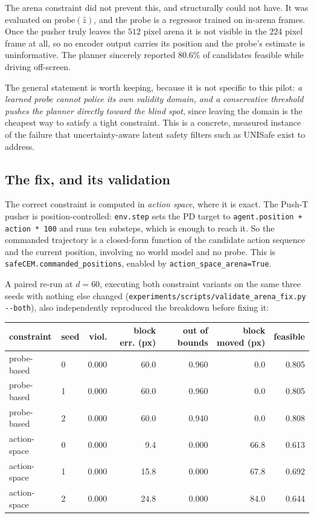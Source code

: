 \documentclass[11pt,a4paper]{article}
\newcommand{\dial}{\ensuremath{d}}
\begin{document}
The arena constraint did not prevent this, and structurally could not have. It was evaluated
on $\text{probe}(\hat z)$, and the probe is a regressor trained on in-arena frames. Once the
pusher truly leaves the $512$ pixel arena it is not visible in the $224$ pixel frame at all,
so no encoder output carries its position and the probe's estimate is uninformative. The
planner sincerely reported $80.6\%$ of candidates feasible while driving off-screen.

The general statement is worth keeping, because it is not specific to this pilot:
\emph{a learned probe cannot police its own validity domain, and a conservative threshold
pushes the planner directly toward the blind spot}, since leaving the domain is the cheapest
way to satisfy a tight constraint. This is a concrete, measured instance of the failure that
uncertainty-aware latent safety filters such as UNISafe \parencite{seo2025unisafe} exist to
address.

\subsection{The fix, and its validation}
\label{sec:fix}

The correct constraint is computed in \emph{action space}, where it is exact. The Push-T
pusher is position-controlled: \texttt{env.step} sets the PD target to
\texttt{agent.position + action * 100} and runs ten substeps, which is enough to reach it. So
the commanded trajectory is a closed-form function of the candidate action sequence and the
current position, involving no world model and no probe. This is
\texttt{safeCEM.commanded\_positions}, enabled by \texttt{action\_space\_arena=True}.

A paired re-run at $\dial = 60$, executing both constraint variants on the same three seeds
with nothing else changed (\texttt{experiments/scripts/validate\_arena\_fix.py -{}-both}), also
independently reproduced the breakdown before fixing it:

\begin{center}
\begin{tabular}{llrrrrr}
\toprule
constraint & seed & viol. & block err. (px) & out of bounds & block moved (px) & feasible \\
\midrule
probe-based   & 0 & 0.000 & 60.0 & 0.960 & 0.0  & 0.805 \\
probe-based   & 1 & 0.000 & 60.0 & 0.960 & 0.0  & 0.805 \\
probe-based   & 2 & 0.000 & 60.0 & 0.940 & 0.0  & 0.808 \\
\midrule
action-space  & 0 & 0.000 & 9.4  & 0.000 & 66.8 & 0.613 \\
action-space  & 1 & 0.000 & 15.8 & 0.000 & 67.8 & 0.692 \\
action-space  & 2 & 0.000 & 24.8 & 0.000 & 84.0 & 0.644 \\
\bottomrule
\end{tabular}
\end{center}
\end{document}
